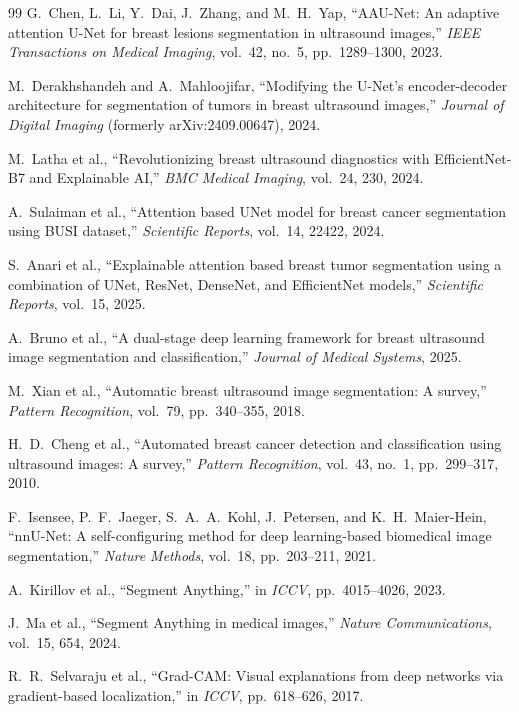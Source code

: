 \documentclass[11pt]{article}
\begin{document}
\begin{thebibliography}{99}
G.~Chen, L.~Li, Y.~Dai, J.~Zhang, and M.~H.~Yap,
``AAU-Net: An adaptive attention U-Net for breast lesions segmentation in ultrasound images,''
\emph{IEEE Transactions on Medical Imaging}, vol.~42, no.~5, pp.~1289--1300, 2023.

M.~Derakhshandeh and A.~Mahloojifar,
``Modifying the U-Net's encoder-decoder architecture for segmentation of tumors in breast ultrasound images,''
\emph{Journal of Digital Imaging} (formerly arXiv:2409.00647), 2024.

M.~Latha et al.,
``Revolutionizing breast ultrasound diagnostics with EfficientNet-B7 and Explainable AI,''
\emph{BMC Medical Imaging}, vol.~24, 230, 2024.

A.~Sulaiman et al.,
``Attention based UNet model for breast cancer segmentation using BUSI dataset,''
\emph{Scientific Reports}, vol.~14, 22422, 2024.

S.~Anari et al.,
``Explainable attention based breast tumor segmentation using a combination of UNet, ResNet, DenseNet, and EfficientNet models,''
\emph{Scientific Reports}, vol.~15, 2025.

A.~Bruno et al.,
``A dual-stage deep learning framework for breast ultrasound image segmentation and classification,''
\emph{Journal of Medical Systems}, 2025.

M.~Xian et al.,
``Automatic breast ultrasound image segmentation: A survey,''
\emph{Pattern Recognition}, vol.~79, pp.~340--355, 2018.

H.~D.~Cheng et al.,
``Automated breast cancer detection and classification using ultrasound images: A survey,''
\emph{Pattern Recognition}, vol.~43, no.~1, pp.~299--317, 2010.

F.~Isensee, P.~F.~Jaeger, S.~A.~A.~Kohl, J.~Petersen, and K.~H.~Maier-Hein,
``nnU-Net: A self-configuring method for deep learning-based biomedical image segmentation,''
\emph{Nature Methods}, vol.~18, pp.~203--211, 2021.

A.~Kirillov et al.,
``Segment Anything,''
in \emph{ICCV}, pp.~4015--4026, 2023.

J.~Ma et al.,
``Segment Anything in medical images,''
\emph{Nature Communications}, vol.~15, 654, 2024.

R.~R.~Selvaraju et al.,
``Grad-CAM: Visual explanations from deep networks via gradient-based localization,''
in \emph{ICCV}, pp.~618--626, 2017.


\end{thebibliography}
\end{document}
